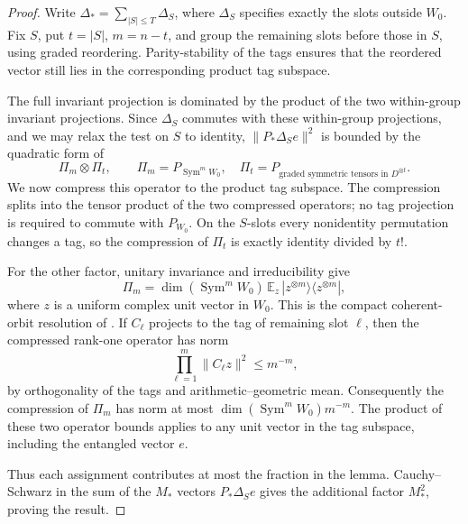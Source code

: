 \begin{proof}
Write \(\Delta_*=\sum_{|S|\le T}\Delta_S\), where \(\Delta_S\)
specifies exactly the slots outside \(W_0\).  Fix \(S\), put
\(t=|S|\), \(m=n-t\), and group the remaining slots before those in
\(S\), using graded reordering.  Parity-stability of the tags ensures
that the reordered vector still lies in the corresponding product
tag subspace.

The full invariant projection is dominated by the product of the two
within-group invariant projections.  Since \(\Delta_S\) commutes with
these within-group projections, and we may relax the test on \(S\) to
identity, \(\|P_*\Delta_Se\|^2\) is bounded by the quadratic form of
\[
 \Pi_m\otimes\Pi_t,
 \qquad
 \Pi_m=P_{\operatorname{Sym}^m W_0},\quad
 \Pi_t=P_{\text{graded symmetric tensors in }D^{\otimes t}}.
\]
We now compress this operator to the product tag subspace.  The
compression splits into the tensor product of the two compressed
operators; no tag projection is required to commute with
\(P_{W_0}\).  On the \(S\)-slots every nonidentity permutation changes
a tag, so the compression of \(\Pi_t\) is exactly identity divided
by \(t!\).

For the other factor, unitary invariance and irreducibility give
\[
 \Pi_m=\dim(\operatorname{Sym}^mW_0)\,
 \mathbb E_z\,|z^{\otimes m}\rangle\langle z^{\otimes m}|,
\]
where \(z\) is a uniform complex unit vector in \(W_0\).  This is the
compact coherent-orbit resolution of
\citet[Section~2]{Perelomov1972}.
If \(C_\ell\) projects to the tag of remaining slot \(\ell\), then
the compressed rank-one operator has norm
\[
 \prod_{\ell=1}^m\|C_\ell z\|^2\le m^{-m},
\]
by orthogonality of the tags and arithmetic--geometric mean.
Consequently the compression of \(\Pi_m\) has norm at most
\(\dim(\operatorname{Sym}^mW_0)m^{-m}\).
The product of these two operator bounds applies to any unit vector
in the tag subspace, including the entangled vector \(e\).

Thus each assignment contributes at most the fraction in the lemma.
Cauchy--Schwarz in the sum of the \(M_*\) vectors \(P_*\Delta_Se\)
gives the additional factor \(M_*^2\), proving the result.
\end{proof}

